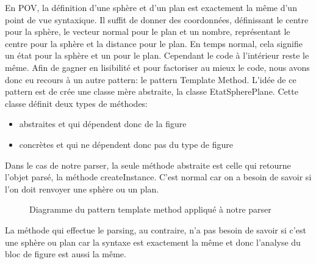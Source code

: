 \documentclass[../../Rapport RayTracer]{subfiles}
\begin{document}
En POV, la définition d'une sphère et d'un plan est exactement la même d'un point de vue syntaxique. Il suffit de donner des coordonnées, définissant le centre pour la sphère, le vecteur normal pour le plan et un nombre, représentant le centre pour la sphère et la distance pour le plan. En temps normal, cela signifie un état pour la sphère et un pour le plan. Cependant le code à l'intérieur reste le même.
Afin de gagner en lisibilité et pour factoriser au mieux le code, nous avons donc eu recours à un autre pattern: le pattern Template Method. L'idée de ce pattern est de crée une classe mère abstraite, la classe EtatSpherePlane. Cette classe définit deux types de méthodes:

\begin{itemize}
\item abstraites et qui dépendent donc de la figure
\item concrètes et qui ne dépendent donc pas du type de figure
\end{itemize}

Dans le cas de notre parser, la seule méthode abstraite est celle qui retourne l'objet parsé, la méthode createInstance. C'est normal car on a besoin de savoir si l'on doit renvoyer une sphère ou un plan.

\begin{figure}[h!]
	
	\caption{Diagramme du pattern template method appliqué à notre parser}
	\label{diagrammePatternTemplateMethod}
\end{figure}
\FloatBarrier

La méthode qui effectue le parsing, au contraire,  n'a pas besoin de savoir si c'est une sphère ou plan car la syntaxe est exactement la même et donc l'analyse du bloc de figure est aussi la même.
\end{document}
